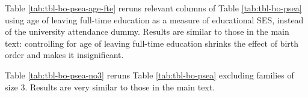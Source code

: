 \documentclass[
]{article}
\theoremstyle{definition}
\theoremstyle{definition}
\theoremstyle{definition}
\theoremstyle{definition}
\theoremstyle{remark}
\begin{document}
Table \ref{tab:tbl-bo-psea-age-fte} reruns relevant columns of Table
\ref{tab:tbl-bo-psea} using age of leaving full-time education as a
measure of educational SES, instead of the university attendance dummy.
Results are similar to those in the main text: controlling for age of
leaving full-time education shrinks the effect of birth order and makes
it insignificant.

Table \ref{tab:tbl-bo-psea-no3} reruns Table \ref{tab:tbl-bo-psea}
excluding families of size 3. Results are very similar to those in the
main text.

 
  \providecommand{\huxb}[2]{\arrayrulecolor[RGB]{#1}\global\arrayrulewidth=#2pt}
  \providecommand{\huxvb}[2]{\color[RGB]{#1}\vrule width #2pt}
  \providecommand{\huxtpad}[1]{\rule{0pt}{#1}}
  \providecommand{\huxbpad}[1]{\rule[-#1]{0pt}{#1}}
\end{document}
